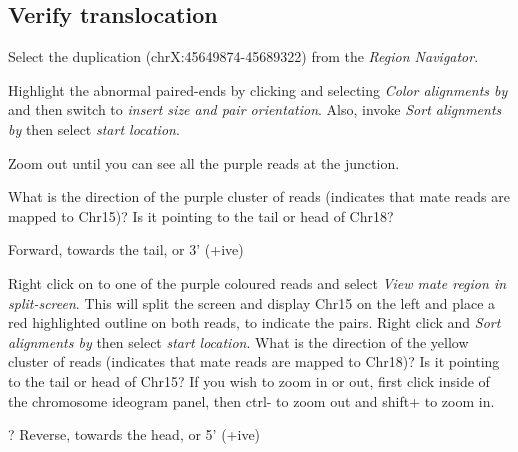 \subsection{Verify translocation}
\begin{advanced}

\begin{steps}
Select the duplication (chrX:45649874-45689322) from the \emph{Region Navigator}. 

Highlight the abnormal paired-ends by clicking and selecting \emph{Color alignments by} and then switch to \emph{insert size and pair orientation}. Also, invoke \emph{Sort alignments by} then select \emph{start location}.

Zoom out until you can see all the purple reads at the junction.
\end{steps}
\end{advanced}

\begin{questions}
What is the direction of the purple cluster of reads (indicates that mate reads are mapped to Chr15)? Is it pointing to the tail or head of Chr18? 
\begin{answer}
Forward, towards the tail, or 3’ (+ive)
\end{answer}
\end{questions}

\begin{questions}
Right click on to one of the purple coloured reads and select \emph{View mate region in split-screen}. This will split the screen and display Chr15 on the left and place a red highlighted outline on both reads, to indicate the pairs. Right click and \emph{Sort alignments by} then select \emph{start location}.
What is the direction of the yellow cluster of reads (indicates that mate reads are mapped to Chr18)? Is it pointing to the tail or head of Chr15? \newline
If you wish to zoom in or out, first click inside of the chromosome ideogram panel, then ctrl- to zoom out and shift+ to zoom in. 
\begin{answer}
? Reverse, towards the head, or 5’ (+ive)
\end{answer}
\end{questions}

